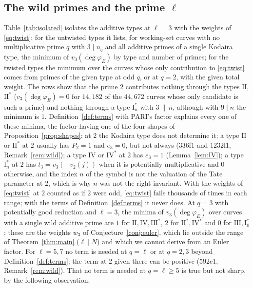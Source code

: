 \documentclass[11pt]{amsart}
\theoremstyle{definition}
\newcommand{\degphi}{\deg\varphi_E}
\begin{document}
\subsection{The wild primes and the prime \texorpdfstring{$\ell$}{l}}\label{sec:wild}
Table~\ref{tab:isolated} isolates the additive types at $\ell=3$ with the weights of \eqref{eq:twist}: for the untwisted types it lists, for working-set curves with no multiplicative prime $q$ with $3\mid n_q$ and all additive primes of a single Kodaira type, the minimum of $v_3(\degphi)$ by type and number of primes; for the twisted types the minimum over the curves whose only contribution to \eqref{eq:twist} comes from primes of the given type at odd $q$, or at $q=2$, with the given total weight. The rows show that the prime $2$ contributes nothing through the types $\mathrm{II}$, $\mathrm{II}^*$ ($v_3(\degphi)=0$ for $14{,}182$ of the $44{,}672$ curves whose only candidate is such a prime) and nothing through a type $\mathrm{I}_n^*$ with $3\,\|\,n$, although with $9\mid n$ the minimum is $1$. Definition~\ref{def:terms} with PARI's factor explains every one of these minima, the factor having one of the four shapes of Proposition~\ref{prop:shapes}: at $2$ the Kodaira type does not determine it; a type $\mathrm{II}$ or $\mathrm{II}^*$ at $2$ usually has $P_2=1$ and $e_3=0$, but not always (336f1 and 1232l1, Remark~\ref{rem:wild}); a type $\mathrm{IV}$ or $\mathrm{IV}^*$ at $2$ has $e_3=1$ (Lemma~\ref{lem:IV}); a type $\mathrm{I}_n^*$ at $2$ has $t_3=v_3(-v_2(j))$ when it is potentially multiplicative and $0$ otherwise, and the index $n$ of the symbol is not the valuation of the Tate parameter at $2$, which is why $n$ was not the right invariant. With the weights of \eqref{eq:twist} at $2$ counted as if $2$ were odd, \eqref{eq:twist} fails thousands of times in each range; with the terms of Definition~\ref{def:terms} it never does. At $q=3$ with potentially good reduction and $\ell=3$, the minima of $v_3(\degphi)$ over curves with a single wild additive prime are $1$ for $\mathrm{II},\mathrm{IV},\mathrm{III}^*$, $2$ for $\mathrm{II}^*,\mathrm{IV}^*$ and $0$ for $\mathrm{III},\mathrm{I}_0^*$: these are the weights $w_3$ of Conjecture~\ref{conj:euler}, which lie outside the range of Theorem~\ref{thm:main} ($\ell\mid N$) and which we cannot derive from an Euler factor. For $\ell=5,7$ no term is needed at $q=\ell$ or at $q=2,3$ beyond Definition~\ref{def:terms}; the term at $2$ given there can be positive (592c1, Remark~\ref{rem:wild}). That no term is needed at $q=\ell\ge5$ is true but not sharp, by the following observation.
\end{document}
